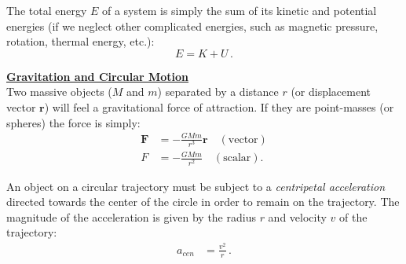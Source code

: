 \documentclass[11pt]{article}
\renewcommand{\section}[1]{\textbf{\underline{#1}}}
\begin{document}
The total energy $E$ of a system is simply the sum of its kinetic and
potential energies (if we neglect other complicated energies, such as
magnetic pressure, rotation, thermal energy, etc.):
\begin{equation}
  E = K + U\,.
\end{equation}


\section{Gravitation and Circular Motion}\\

Two massive objects ($M$ and $m$) separated by a distance $r$ (or
displacement vector $\mathbf{r}$) will feel a gravitational force of
attraction. If they are point-masses (or spheres) the force is simply:
\begin{align}
  \mathbf{F} &= -\frac{GMm}{r^3}\mathbf{r}\quad(\mathrm{vector})\\
  F &= -\frac{GMm}{r^2} \quad (\mathrm{scalar}).
\end{align}

An object on a circular trajectory must be subject to a
\textit{centripetal acceleration} directed towards the center of the circle
in order to remain on the trajectory. The magnitude of the
acceleration is given by the radius $r$ and velocity $v$ of the trajectory:
\begin{align}
  a_{cen} &= \frac{v^2}{r}\,.
\end{align}
\end{document}
